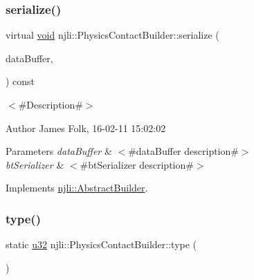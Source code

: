 \subsubsection{\texorpdfstring{serialize()}{serialize()}}
{\footnotesize\ttfamily virtual \mbox{\hyperlink{_thread_8h_af1e856da2e658414cb2456cb6f7ebc66}{void}} njli\+::\+Physics\+Contact\+Builder\+::serialize (\begin{DoxyParamCaption}\item[{\mbox{\hyperlink{_thread_8h_af1e856da2e658414cb2456cb6f7ebc66}{void}} $\ast$}]{data\+Buffer,  }\item[{bt\+Serializer $\ast$}]{ }\end{DoxyParamCaption}) const\hspace{0.3cm}{\ttfamily [virtual]}}



$<$\#\+Description\#$>$ 

\begin{DoxyAuthor}{Author}
James Folk, 16-\/02-\/11 15\+:02\+:02
\end{DoxyAuthor}

\begin{DoxyParams}{Parameters}
{\em data\+Buffer} & $<$\#data\+Buffer description\#$>$ \\
\hline
{\em bt\+Serializer} & $<$\#bt\+Serializer description\#$>$ \\
\hline
\end{DoxyParams}


Implements \mbox{\hyperlink{classnjli_1_1_abstract_builder_ab66b774e02ccb9da554c9aab7fa6d981}{njli\+::\+Abstract\+Builder}}.

\mbox{\label{classnjli_1_1_physics_contact_builder_aed94e9c8813e241ef93896673e43dd0e}} 
\subsubsection{\texorpdfstring{type()}{type()}}
{\footnotesize\ttfamily static \mbox{\hyperlink{_util_8h_a10e94b422ef0c20dcdec20d31a1f5049}{u32}} njli\+::\+Physics\+Contact\+Builder\+::type (\begin{DoxyParamCaption}{ }\end{DoxyParamCaption})\hspace{0.3cm}{\ttfamily [static]}}

